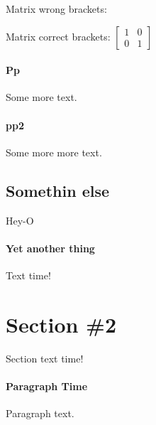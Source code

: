 \documentclass{article}
\begin{document}
    \noindent
    Matrix wrong brackets:
    \begin{equation*}
    [
    \begin{matrix}
      1 & 0 \\
      0 & 1
    \end{matrix}
    ]
    \end{equation*}

    \noindent
    Matrix correct brackets:
    $
    \left[
    \begin{matrix}
      1 & 0 \\
      0 & 1
    \end{matrix}
    \right]
    $


  \paragraph{Pp}
    Some more text.

  \paragraph{pp2}
    Some more more text.

  \subsection{Somethin else}
    Hey-O

  \paragraph{Yet another thing}
    Text time!

  \section{Section \#2}
    Section text time!

  \paragraph{Paragraph Time}
    Paragraph text.
\end{document}
